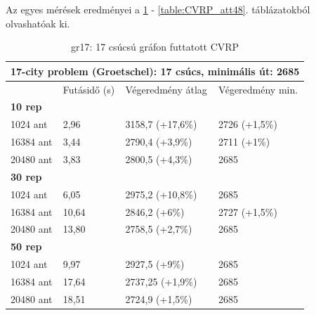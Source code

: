 Az egyes mérések eredményei a \ref{table:CVRP_gr17} - \ref{table:CVRP_att48}. táblázatokból olvashatóak ki.

\begin{table}[ht!]
	\centering
	\begin{tabular}{|p{2cm}||p{3cm}|p{3.5cm}|p{3.5cm}|}
		\hline
		\multicolumn{4}{|c|}{17-city problem (Groetschel): 17 csúcs, minimális út: 2685} \\
		\hline
		& Futásidő (s) & Végeredmény átlag & Végeredmény min.\\
		\hline
		\textbf{10 rep} & & & \\
		1024 ant & 2,96 & 3158,7 (+17,6\%) & 2726 (+1,5\%) \\
		16384 ant & 3,44 & 2790,4 (+3,9\%) & 2711 (+1\%) \\
		20480 ant & 3,83 & 2800,5 (+4,3\%) & 2685 \\
		\hline
		\textbf{30 rep} & & & \\
		1024 ant & 6,05 & 2975,2 (+10,8\%) & 2685\\
		16384 ant & 10,64 & 2846,2 (+6\%) & 2727 (+1,5\%) \\
		20480 ant & 13,80 & 2758,5 (+2,7\%) & 2685 \\
		\hline
		\textbf{50 rep} & & & \\
		1024 ant & 9,97 & 2927,5 (+9\%) & 2685 \\
		16384 ant & 17,64 & 2737,25 (+1,9\%) & 2685\\
		20480 ant & 18,51 & 2724,9 (+1,5\%) & 2685\\
		\hline
	\end{tabular}
	\caption{gr17: 17 csúcsú gráfon futtatott CVRP}
	\label{table:CVRP_gr17}
\end{table}

